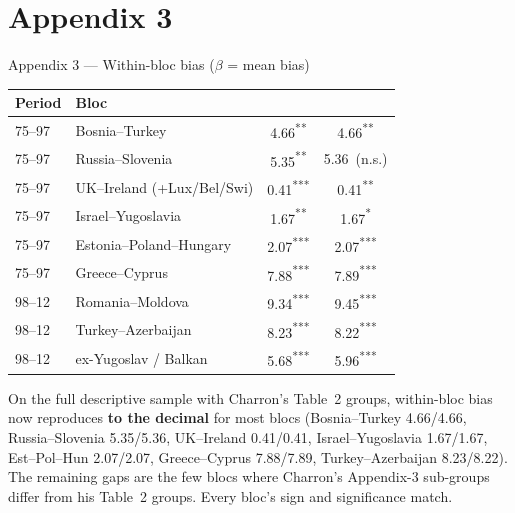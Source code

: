 \documentclass[aspectratio=169,10pt]{beamer}
\newcommand{\paper}[1]{{\color{papercol}#1}}
\newcommand{\rep}[1]{{\color{repcol}#1}}
\newcommand{\pstar}[1]{{\color{papercol}\textsuperscript{#1}}}
\newcommand{\rstar}[1]{{\color{repcol}\textsuperscript{#1}}}
\newcommand{\phead}[1]{\cellcolor{papercol!12}\paper{\textbf{#1}}}
\newcommand{\rhead}[1]{\cellcolor{repcol!12}\rep{\textbf{#1}}}
\begin{document}
\section{Appendix 3}
\begin{frame}{Appendix 3 --- Within-bloc bias ($\beta$ = mean bias)}
  \centering\small
  \renewcommand{\arraystretch}{1.25}
  \begin{tabular}{@{}l l c c@{}}
    \toprule
    Period & Bloc & \phead{Charron $\beta$} & \rhead{Repl. $\beta$}\\
    \midrule
    75--97 & Bosnia--Turkey            & 4.66\pstar{**}  & 4.66\rstar{**}\\
    75--97 & Russia--Slovenia          & 5.35\pstar{**}  & 5.36\ (n.s.)\\
    75--97 & UK--Ireland (+Lux/Bel/Swi)& 0.41\pstar{***} & 0.41\rstar{**}\\
    75--97 & Israel--Yugoslavia        & 1.67\pstar{**}  & 1.67\rstar{*}\\
    75--97 & Estonia--Poland--Hungary  & 2.07\pstar{***} & 2.07\rstar{***}\\
    75--97 & Greece--Cyprus            & 7.88\pstar{***} & 7.89\rstar{***}\\
    \midrule
    98--12 & Romania--Moldova          & 9.34\pstar{***} & 9.45\rstar{***}\\
    98--12 & Turkey--Azerbaijan        & 8.23\pstar{***} & 8.22\rstar{***}\\
    98--12 & ex-Yugoslav / Balkan      & 5.68\pstar{***} & 5.96\rstar{***}\\
    \bottomrule
  \end{tabular}

  \vspace{6pt}
  \footnotesize
  On the full descriptive sample with Charron's Table~2 groups, within-bloc bias now
  reproduces \textbf{to the decimal} for most blocs (Bosnia--Turkey 4.66/4.66,
  Russia--Slovenia 5.35/5.36, UK--Ireland 0.41/0.41, Israel--Yugoslavia 1.67/1.67,
  Est--Pol--Hun 2.07/2.07, Greece--Cyprus 7.88/7.89, Turkey--Azerbaijan 8.23/8.22).
  The remaining gaps are the few blocs where Charron's Appendix-3 sub-groups differ
  from his Table~2 groups. Every bloc's sign and significance match.
\end{frame}

\end{document}
